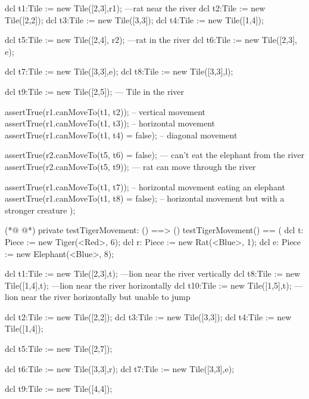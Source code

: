 \begin{vdmpp}[breaklines=true]
             dcl t1:Tile := new Tile([2,3],r1); ---rat near the river
             dcl t2:Tile := new Tile([2,2]);
             dcl t3:Tile := new Tile([3,3]);
             dcl t4:Tile := new Tile([1,4]);
             
             dcl t5:Tile := new Tile([2,4], r2); ---rat in the river
             dcl t6:Tile := new Tile([2,3], e);
             
             dcl t7:Tile := new Tile([3,3],e);
             dcl t8:Tile := new Tile([3,3],l);
             
             dcl t9:Tile := new Tile([2,5]); --- Tile in the river
             
             assertTrue(r1.canMoveTo(t1, t2)); -- vertical movement
             assertTrue(r1.canMoveTo(t1, t3)); -- horizontal movement
             assertTrue(r1.canMoveTo(t1, t4) = false); -- diagonal movement
             
             assertTrue(r2.canMoveTo(t5, t6) = false); --- can't eat the elephant from the river
             assertTrue(r2.canMoveTo(t5, t9)); --- rat can move through the river
             
             assertTrue(r1.canMoveTo(t1, t7)); -- horizontal movement eating an elephant
             assertTrue(r1.canMoveTo(t1, t8) = false); -- horizontal movement but with a stronger creature
  );
  
(*@
\label{testTigerMovement:170}
@*)
        private testTigerMovement: () ==> ()
         testTigerMovement() ==
         (
                 dcl t: Piece := new Tiger(<Red>, 6);
                 dcl r: Piece := new Rat(<Blue>, 1);
                 dcl e: Piece := new Elephant(<Blue>, 8);
                 
             dcl t1:Tile := new Tile([2,3],t); ---lion near the river vertically
             dcl t8:Tile := new Tile([1,4],t); ---lion near the river horizontally
             dcl t10:Tile := new Tile([1,5],t); ---lion near the river horizontally but unable to jump
             
             dcl t2:Tile := new Tile([2,2]);
             dcl t3:Tile := new Tile([3,3]);
             dcl t4:Tile := new Tile([1,4]);
             
             dcl t5:Tile := new Tile([2,7]);
             
             dcl t6:Tile := new Tile([3,3],r);
             dcl t7:Tile := new Tile([3,3],e);
             
             dcl t9:Tile := new Tile([4,4]);
             

\end{vdmpp}
